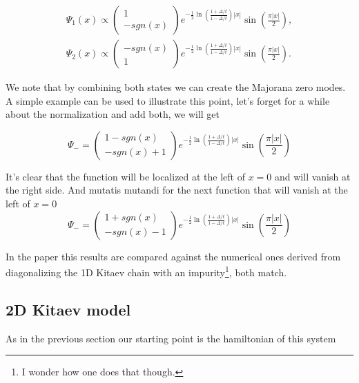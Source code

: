 \begin{eqnarray}
    \Psi_1(x) \propto \begin{pmatrix} 1 \\ -sgn(x) \end{pmatrix} e^{-\frac{1}{2}\ln \left(\frac{1+\Delta/t}{1-\Delta/t}\right)|x|}\sin\left(\frac{\pi|x|}{2}\right),\\
    \Psi_2(x) \propto \begin{pmatrix} -sgn(x) \\ 1 \end{pmatrix} e^{-\frac{1}{2}\ln \left(\frac{1+\Delta/t}{1-\Delta/t}\right)|x|}\sin\left(\frac{\pi|x|}{2}\right).
\end{eqnarray}

We note that by combining both states we can create the Majorana zero modes. A simple example can be used to illustrate this point, let's forget for a while about the normalization and add both, we will get 

\begin{equation*}
    \Psi_- = \begin{pmatrix} 1 -sgn(x)\\ -sgn(x) + 1 \end{pmatrix} e^{-\frac{1}{2}\ln \left(\frac{1+\Delta/t}{1-\Delta/t}\right)|x|}\sin\left(\frac{\pi|x|}{2}\right)
\end{equation*}

It's clear that the function will be localized at the left of $x=0$ and will vanish at the right side. And mutatis mutandi for the next function
that will vanish at the left of $x=0$
\begin{equation*}
    \Psi_- = \begin{pmatrix} 1 + sgn(x)\\ -sgn(x) - 1 \end{pmatrix} e^{-\frac{1}{2}\ln \left(\frac{1+\Delta/t}{1-\Delta/t}\right)|x|}\sin\left(\frac{\pi|x|}{2}\right)
\end{equation*}

In the paper this results are compared against the numerical ones derived from diagonalizing the 1D Kitaev chain with an impurity\footnote{I wonder how one does that though.}, both match.

\subsection{2D Kitaev model}

As in the previous section our starting point is the hamiltonian of this system

